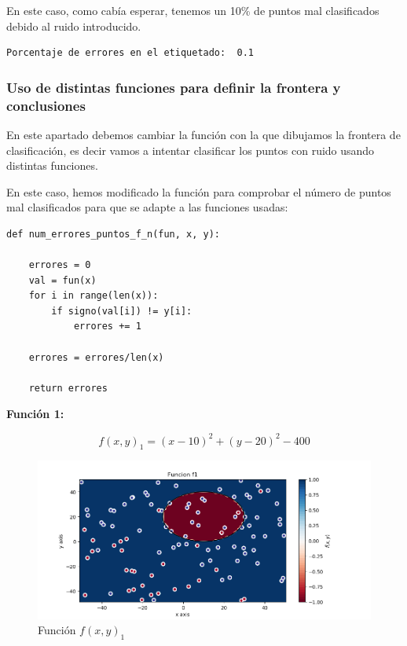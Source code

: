 \documentclass[12pt, spanish]{article}
\begin{document}
En este caso, como cabía esperar, tenemos un 10\% de puntos mal clasificados debido al ruido introducido.

\begin{lstlisting}
Porcentaje de errores en el etiquetado:  0.1
\end{lstlisting}



\subsubsection{Uso de distintas funciones para definir la frontera y conclusiones}

En este apartado debemos cambiar la función con la que dibujamos la frontera de clasificación, es decir vamos a intentar clasificar los puntos con ruido usando distintas funciones.

En este caso, hemos modificado la función para comprobar el número de puntos mal clasificados para que se adapte a las funciones usadas:

\begin{lstlisting}
def num_errores_puntos_f_n(fun, x, y):

	errores = 0
	val = fun(x)
	for i in range(len(x)):
		if signo(val[i]) != y[i]:
			errores += 1

	errores = errores/len(x)

	return errores
\end{lstlisting}

\textbf{Función 1:} 

$$ f(x, y)_1 = (x - 10)^2 + (y - 20)^2 - 400  $$

\begin{figure}[H]
  \centering
      \includegraphics[scale = 0.70]{ej1-3-f1.png}
 		 \caption{Función $f(x, y)_1$}
  		\label{fig:ej1-f1}

\end{figure}
\end{document}
